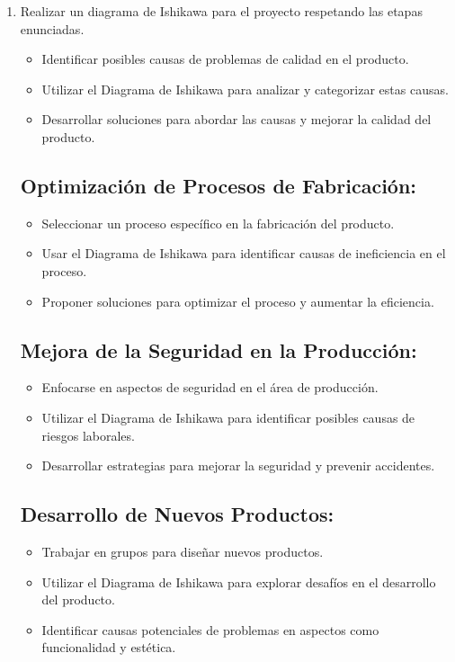 \documentclass[../main]{subfiles}
\begin{document}
\begin{enumerate}
  \item  Realizar un diagrama de Ishikawa para el proyecto respetando
    las etapas enunciadas.

    \begin{itemize}
      \item Identificar posibles causas de problemas de calidad en el producto.
      \item Utilizar el Diagrama de Ishikawa para analizar y
        categorizar estas causas.
      \item Desarrollar soluciones para abordar las causas y mejorar
        la calidad del producto.
    \end{itemize}

    \subsection*{Optimización de Procesos de Fabricación:}
    \begin{itemize}
      \item Seleccionar un proceso específico en la fabricación del producto.
      \item Usar el Diagrama de Ishikawa para identificar causas de
        ineficiencia en el proceso.
      \item Proponer soluciones para optimizar el proceso y aumentar
        la eficiencia.
    \end{itemize}

    \subsection*{Mejora de la Seguridad en la Producción:}
    \begin{itemize}
      \item Enfocarse en aspectos de seguridad en el área de producción.
      \item Utilizar el Diagrama de Ishikawa para identificar
        posibles causas de riesgos laborales.
      \item Desarrollar estrategias para mejorar la seguridad y
        prevenir accidentes.
    \end{itemize}

    \subsection*{Desarrollo de Nuevos Productos:}
    \begin{itemize}
      \item Trabajar en grupos para diseñar nuevos productos.
      \item Utilizar el Diagrama de Ishikawa para explorar desafíos
        en el desarrollo del producto.
      \item Identificar causas potenciales de problemas en aspectos
        como funcionalidad y estética.
    \end{itemize}

\end{enumerate}
\end{document}
